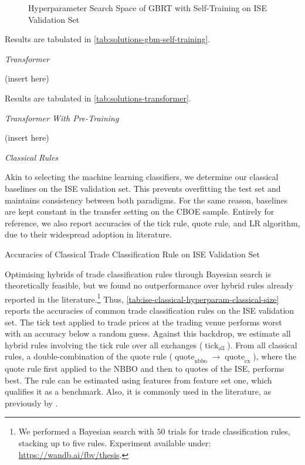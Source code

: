 \clearpage

\begin{figure}[ht]
    \addtocounter{figure}{-1}
    \caption[]{Hyperparameter Search Space of \gls{GBRT} with Self-Training on \gls{ISE} Validation Set}
    \label{fig:ise-gbm-self-training-hyperparam}
\end{figure}

Results are tabulated in \cref{tab:solutions-gbm-self-training}.

\emph{Transformer}

(insert here)

Results are tabulated in \cref{tab:solutions-transformer}.

\emph{Transformer With Pre-Training}

(insert here)

\emph{Classical Rules}

Akin to selecting the machine learning classifiers, we determine our classical baselines on the \gls{ISE} validation set. This prevents \gls{overfitting} the test set and maintains consistency between both paradigms. For the same reason, baselines are kept constant in the transfer setting on the \gls{CBOE} sample. Entirely for reference, we also report accuracies of the tick rule, quote rule, and \gls{LR} algorithm, due to their widespread adoption in literature.

\begin{table}[H]
    \centering
    \caption[Accuracies of Classical Trade Classification Rule on  Validation Set]{Accuracies of Classical Trade Classification Rule on \gls{ISE} Validation Set}
    \label{tab:ise-classical-hyperparam-classical-size}
    
\end{table}

Optimising hybrids of trade classification rules through Bayesian search is theoretically feasible, but we found no outperformance over hybrid rules already reported in the literature.\footnote{We performed a Bayesian search with $50$ trials for trade classification rules, stacking up to five rules. Experiment available under: \url{https://wandb.ai/fbv/thesis}.} Thus, \cref{tab:ise-classical-hyperparam-classical-size} reports the accuracies of common trade classification rules on the \gls{ISE} validation set. The tick test applied to trade prices at the trading venue performs worst with an accuracy below a random guess. Against this backdrop, we estimate all hybrid rules involving the tick rule over all exchanges ($\operatorname{tick}_{\mathrm{all}}$). From all classical rules, a double-combination of the quote rule ($\operatorname{quote}_{\mathrm{nbbo}} \to \operatorname{quote}_{\mathrm{ex}}$), where the quote rule first applied to the \gls{NBBO} and then to quotes of the \gls{ISE}, performs best. The rule can be estimated using features from feature set one, which qualifies it as a benchmark. Also, it is commonly used in the literature, as previously by \textcite[][]{muravyevOptionsTradingCosts2020}.

